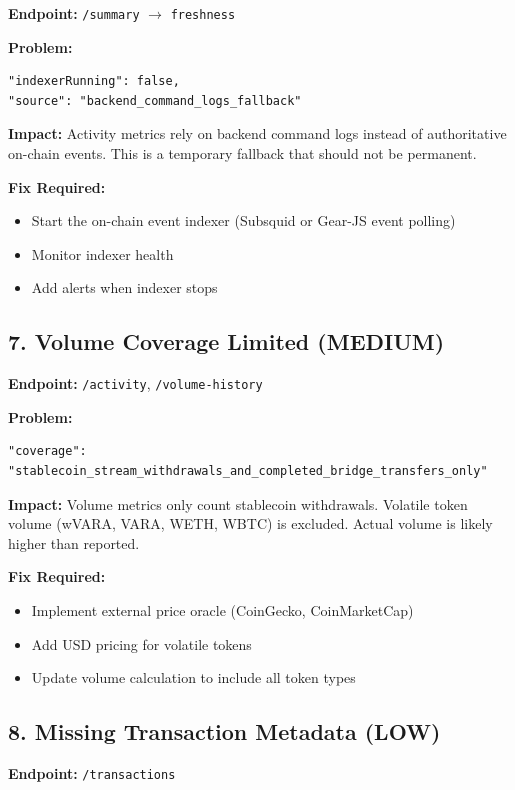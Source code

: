 \documentclass[11pt,a4paper]{article}
\begin{document}
\textbf{Endpoint:} \texttt{/summary} $\rightarrow$ \texttt{freshness}

\textbf{Problem:}
\begin{lstlisting}
"indexerRunning": false,
"source": "backend_command_logs_fallback"
\end{lstlisting}

\textbf{Impact:} Activity metrics rely on backend command logs instead of authoritative on-chain events. This is a temporary fallback that should not be permanent.

\textbf{Fix Required:}
\begin{itemize}
    \item Start the on-chain event indexer (Subsquid or Gear-JS event polling)
    \item Monitor indexer health
    \item Add alerts when indexer stops
\end{itemize}

\subsection{7. Volume Coverage Limited (MEDIUM)}

\textbf{Endpoint:} \texttt{/activity}, \texttt{/volume-history}

\textbf{Problem:}
\begin{lstlisting}
"coverage": "stablecoin_stream_withdrawals_and_completed_bridge_transfers_only"
\end{lstlisting}

\textbf{Impact:} Volume metrics only count stablecoin withdrawals. Volatile token volume (wVARA, VARA, WETH, WBTC) is excluded. Actual volume is likely higher than reported.

\textbf{Fix Required:}
\begin{itemize}
    \item Implement external price oracle (CoinGecko, CoinMarketCap)
    \item Add USD pricing for volatile tokens
    \item Update volume calculation to include all token types
\end{itemize}

\subsection{8. Missing Transaction Metadata (LOW)}

\textbf{Endpoint:} \texttt{/transactions}
\end{document}
